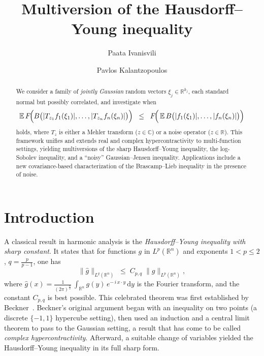 \documentclass[9pt, a4paper]{amsart}
\newcommand{\1}{{\chi_{}}}%
\numberwithin{equation}{section}
\begin{document}
	\title{Multiversion of the Hausdorff--Young inequality}
	\author[P.~Ivanisvili]{Paata Ivanisvili}
	\author[P.~Kalantzopoulos]{Pavlos Kalantzopoulos}
	
	\address{Department of Mathematics, University of California Irvine, Irvine, CA
	}
	
	\address{Department of Mathematics, University of California Irvine, Irvine, CA
	}
	\makeatletter
	\makeatother
	\keywords{}
\begin{abstract}
We consider a family of \emph{jointly Gaussian} random vectors \(\xi_j \in \mathbb{R}^{k_j}\), each standard normal but possibly correlated, and investigate when
\[
\mathbb{E}\, F\!\Bigl(B\bigl(|T_{z_1} f_1(\xi_1)|,\dots,|T_{z_n} f_n(\xi_n)|\bigr)\Bigr)
\;\;\le\;\;
F\!\Bigl(\,\mathbb{E}\,B\bigl(|f_1(\xi_1)|,\dots,|f_n(\xi_n)|\bigr)\Bigr)
\]
holds, where \(T_{z}\) is either a Mehler transform (\(z \in \mathbb{C}\)) or a noise operator (\(z \in \mathbb{R}\)).
This framework unifies and extends real and complex hypercontractivity to multi-function settings, yielding multiversions of the sharp Hausdorff--Young inequality, the log-Sobolev inequality, and a ``noisy'' Gaussian--Jensen inequality.
Applications include a new covariance-based characterization of the Brascamp--Lieb inequality in the presence of noise.
\end{abstract}


	\maketitle 
	
	



\section{Introduction}

A classical result in harmonic analysis is the \emph{Hausdorff--Young inequality with sharp constant}. It states that for functions $g$ in  $L^{p}(\mathbb{R}^{n})$  and exponents $1<p\leq 2$, $q=\frac{p}{p-1}$, one has
\[
\bigl\|\widehat{g}\bigr\|_{L^q(\mathbb{R}^n)}
\;\le\;
C_{p,q}
\;\bigl\|g\bigr\|_{L^p(\mathbb{R}^n)},
\]
where $\widehat{g}(x) =\frac{1}{(2\pi)^{\frac{n}{2}}} \,\int_{\mathbb{R}^n} g(y)\, e^{-\,i \, x\cdot y}\,\mathrm{d}y$ is the Fourier transform, and the constant \(C_{p,q}\) is best possible. This celebrated theorem was first established by Beckner~\cite{Beckner}. Beckner's original argument began with an inequality on two points (a discrete \(\{-1,1\}\) hypercube setting), then used an induction and a central limit theorem to pass to the Gaussian setting, a result that has come to be called \emph{complex hypercontractivity}. Afterward, a suitable change of variables yielded the Hausdorff--Young inequality in its full sharp form.
\end{document}
